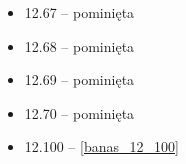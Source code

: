\begin{multicols}{3}
\begin{itemize}
    \item 12.67 -- pominięta
    \item 12.68 -- pominięta
    \item 12.69 -- pominięta
    \item 12.70 -- pominięta
    \item 12.100 -- \ref{banas_12_100}

\end{itemize}
\end{multicols}
